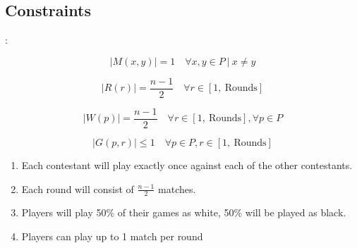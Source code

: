 \documentclass[
9pt,
aspectratio=169,
xcolor=table,
]{beamer}
\begin{document}
\subsection{Constraints}
\begin{frame}{\secname: \subsecname}
    \begin{minipage}{0.49\textwidth}
	\begin{equation}
	    \label{playwitheachother}
	    |M(x,y)| = 1 \quad \forall x,y \in P \ | \  x \neq y
	\end{equation}

	\begin{equation}
	    \label{matchesperround}
	    |R(r)| = \frac{n-1}{2}  \quad \forall r \in [1,\ \text{Rounds}] 
	\end{equation}

	\begin{equation}
	    \label{fairness}
	    |W(p)| = \frac{n-1}{2} \quad \forall r \in [1, \ \text{Rounds}], \forall p \in P
	\end{equation}

	\begin{equation}
	    \label{1gameperround}
	    |G(p,r)| \leq 1 \quad \forall p \in P, r \in [1, \ \text{Rounds}] 
	\end{equation}


    \end{minipage}
    \hfill
    \begin{minipage}{0.49\textwidth}
	\begin{enumerate}
	    \item Each contestant will play exactly once against each of the other contestants.
	    \item Each round will consist of $\frac{n-1}{2}$ matches.
	    \item Players will play 50\% of their games as white, 50\% will be played as black.
	    \item Players can play up to 1 match per round
	\end{enumerate}
    \end{minipage}

\end{frame}
\end{document}
